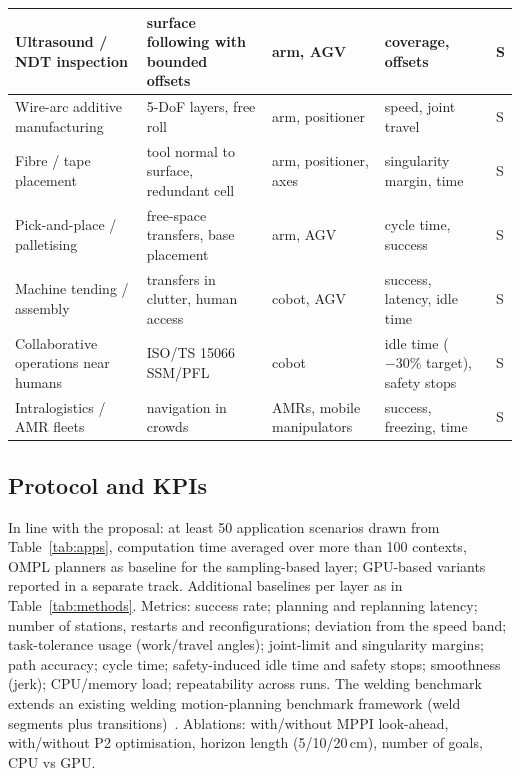 \documentclass{plan4ari_report}
\begin{document}
{\begin{longtable}{|L{2.8cm}|L{4.4cm}|L{2.9cm}|L{2.6cm}|L{1.2cm}|}
Ultrasound / NDT inspection & surface following with bounded offsets~\cite{yin2024dprealtime} & arm, AGV & coverage, offsets & S \\ \hline
Wire-arc additive manufacturing & 5-DoF layers, free roll~\cite{dharmawan2018functional} & arm, positioner & speed, joint travel & S \\ \hline
Fibre / tape placement & tool normal to surface, redundant cell~\cite{farzanehkaloorazi2018pathplacement} & arm, positioner, axes & singularity margin, time & S \\ \hline
Pick-and-place / palletising & free-space transfers, base placement~\cite{wachter2024tcpbase} & arm, AGV & cycle time, success & S \\ \hline
Machine tending / assembly & transfers in clutter, human access & cobot, AGV & success, latency, idle time & S \\ \hline
Collaborative operations near humans & ISO/TS 15066 SSM/PFL~\cite{faroni2022safetyaware,gursoy2026cosmik} & cobot & idle time ($-30\%$ target), safety stops & S \\ \hline
Intralogistics / AMR fleets & navigation in crowds~\cite{trevisan2025drampi,macenski2023nav2survey} & AMRs, mobile manipulators & success, freezing, time & S \\ \hline
\end{longtable}}

\subsection{Protocol and KPIs}
In line with the proposal: at least 50 application scenarios drawn from Table~\ref{tab:apps}, computation time averaged over more than 100 contexts, OMPL planners as baseline for the sampling-based layer; GPU-based variants reported in a separate track. Additional baselines per layer as in Table~\ref{tab:methods}. Metrics: success rate; planning and replanning latency; number of stations, restarts and reconfigurations; deviation from the speed band; task-tolerance usage (work/travel angles); joint-limit and singularity margins; path accuracy; cycle time; safety-induced idle time and safety stops; smoothness (jerk); CPU/memory load; repeatability across runs. The welding benchmark extends an existing welding motion-planning benchmark framework (weld segments plus transitions)~\cite{demaeyer2021weldbenchmark}. Ablations: with/without MPPI look-ahead, with/without P2 optimisation, horizon length (5/10/20\,cm), number of goals, CPU vs GPU.
\end{document}

